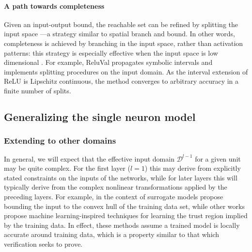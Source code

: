 
\paragraph{A path towards completeness}
Given an input-output bound, the reachable set can be refined by splitting the input space \citep{henriksen2021deepsplit,rubies2019fast}---a strategy similar to spatial branch and bound. In other words, completeness is achieved by branching in the input space, rather than activation patterns: this strategy is especially effective when the input space is low dimensional \citep{strong2022zope}. For example, ReluVal \citep{wang2018formal} propagates symbolic intervals and implements splitting procedures on the input domain. As the interval extension of ReLU is Lipschitz continuous, the method converges to arbitrary accuracy in a finite number of splits.

\subsection{Generalizing the single neuron model}

\subsubsection{Extending to other domains} \label{sec:domains}
In general, we will expect that the effective input domain $\mathcal{D}^{l-1}$ for a given unit may be quite complex. For the first layer ($l=1$) this may derive from explicitly stated constraints on the inputs of the networks, while for later layers this will typically derive from the complex nonlinear transformations applied by the preceding layers. 
For example, in the context of surrogate models \cite{yang2022modeling} propose bounding the input to the convex hull of the training data set, while other works \citep{schweidtmann2022obey,shi2022careful} propose machine learning-inspired techniques for learning the trust region implied by the training data. 
In effect, these methods assume a trained model is locally accurate around training data, which is a property similar to that which verification seeks to prove. 

